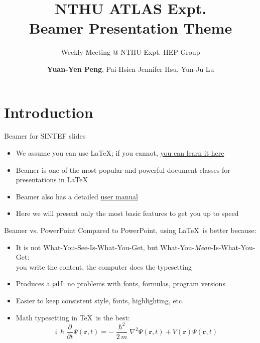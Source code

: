 \documentclass[12pt,aspectratio=169]{beamer}
\title{NTHU ATLAS Expt.\\
Beamer Presentation Theme}
\subtitle{Weekly Meeting @ NTHU Expt. HEP Group}
\author{\textbf{Yuan-Yen Peng}, Pai-Hsien Jennifer Hsu, Yun-Ju Lu}
\begin{document}
\maketitle

\section{Introduction}

\begin{frame}{Beamer for SINTEF slides}{\thesection \, \secname}
    \begin{itemize}
        \item We assume you can use \LaTeX; if you cannot,
        \href{http://en.wikibooks.org/wiki/LaTeX/}{you can learn it here}
        \item Beamer is one of the most popular and powerful document
        classes for presentations in \LaTeX
        \item Beamer also has a detailed
        \href{http://www.ctan.org/tex-archive/macros/latex/contrib/beamer/doc/beameruserguide.pdf}{user manual}
        \item Here we will present only the most basic features to get you up to speed
    \end{itemize}
\end{frame}

\begin{frame}{Beamer vs. PowerPoint}
Compared to PowerPoint, using \LaTeX\ is better because:
    \begin{itemize}
        \item It is not What-You-See-Is-What-You-Get, but
        What-You-\emph{Mean}-Is-What-You-Get:\\
        you write the content, the computer does the typesetting
        \item Produces a \texttt{pdf}: no problems with fonts, formulas,
              program versions
        \item Easier to keep consistent style, fonts, highlighting, etc.
        \item Math typesetting in \TeX\ is the best:
        \begin{equation*}
            \mathrm{i}\,\hslash\frac{\partial}{\partial t} \Psi(\mathbf{r},t) =
            -\frac{\hslash^2}{2\,m}\nabla^2\Psi(\mathbf{r},t)
            + V(\mathbf{r})\Psi(\mathbf{r},t)
        \end{equation*}
    
    \end{itemize}
\end{frame}
\end{document}
